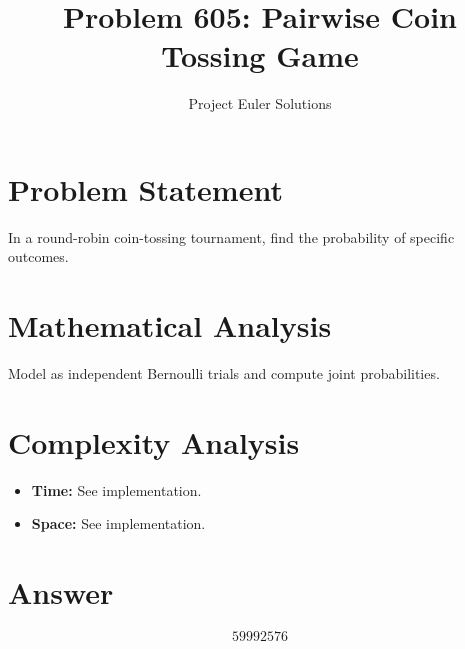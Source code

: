\documentclass[11pt]{article}
\title{Problem 605: Pairwise Coin Tossing Game}
\author{Project Euler Solutions}
\date{}
\begin{document}
\maketitle

\section{Problem Statement}
In a round-robin coin-tossing tournament, find the probability of specific outcomes.

\section{Mathematical Analysis}
Model as independent Bernoulli trials and compute joint probabilities.

\section{Complexity Analysis}
\begin{itemize}
    \item \textbf{Time:} See implementation.
    \item \textbf{Space:} See implementation.
\end{itemize}

\section{Answer}

\[
\boxed{59992576}
\]
\end{document}
